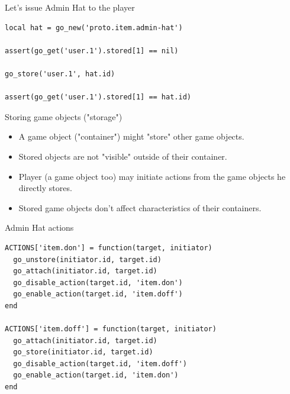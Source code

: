 \documentclass[aspectratio=169,handout,bigger]{beamer}
\begin{document}

\begin{frame}[fragile]{Let's issue Admin Hat to the player}
\begin{verbatim}
local hat = go_new('proto.item.admin-hat')

assert(go_get('user.1').stored[1] == nil)

go_store('user.1', hat.id)

assert(go_get('user.1').stored[1] == hat.id)
\end{verbatim}
\end{frame}


\begin{frame}{Storing game objects ("storage")}
  \begin{itemize}
    \item A game object ("container") might "store" other game objects.
    \item Stored objects are not "visible" outside of their container.
    \item Player (a game object too) may initiate actions
          from the game objects he directly stores.
    \item Stored game objects don't affect characteristics of their containers.
  \end{itemize}
\end{frame}


\begin{frame}[fragile]{Admin Hat actions}
\begin{verbatim}
ACTIONS['item.don'] = function(target, initiator)
  go_unstore(initiator.id, target.id)
  go_attach(initiator.id, target.id)
  go_disable_action(target.id, 'item.don')
  go_enable_action(target.id, 'item.doff')
end

ACTIONS['item.doff'] = function(target, initiator)
  go_attach(initiator.id, target.id)
  go_store(initiator.id, target.id)
  go_disable_action(target.id, 'item.doff')
  go_enable_action(target.id, 'item.don')
end
\end{verbatim}
\end{frame}

\end{document}
